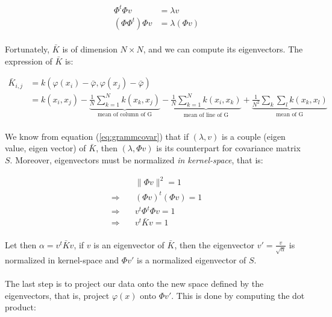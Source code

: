 \documentclass[a4paper]{article}
\begin{document}
\begin{align}\label{eq:grammcovar}
\Phi^t\Phi v &= \lambda v \\
(\Phi\Phi^t)\Phi v &= \lambda (\Phi v)
\end{align}

\paragraph{}
Fortunately, $\bar{K}$ is of dimension $N \times N$, and we can compute its eigenvectors. The expression of $\bar{K}$ is:

\begin{align*}
\bar{K}_{i, j} &= k(\varphi(x_i) - \bar{\varphi}, \varphi(x_j) - \bar{\varphi}) \\
&= k(x_i, x_j)
	- \underbrace{\frac{1}{N}\sum_{k = 1}^N k(x_k, x_j)}_{\text{mean of column of G}}
    - \underbrace{\frac{1}{N}\sum_{k = 1}^N k(x_i, x_k)}_{\text{mean of line of G}}
    + \underbrace{\frac{1}{N^2}\sum_k\sum_l k(x_k, x_l)}_{\text{mean of G}}
\end{align*}

\paragraph{}
We know from equation (\ref{eq:grammcovar}) that if $(\lambda, v)$ is a couple (eigen value, eigen vector) of $\bar{K}$, then $(\lambda, \Phi v)$ is its counterpart for covariance matrix $S$. Moreover, eigenvectors must be normalized \emph{in kernel-space}, that is:

\begin{align*}
&\| \Phi v \|^2 = 1 \\
\Rightarrow\quad &(\Phi v)^t(\Phi v) = 1 \\
\Rightarrow\quad &v^t\Phi^t\Phi v = 1 \\
\Rightarrow\quad &v^t \bar{K} v = 1
\end{align*}

\paragraph{}
Let then $\alpha = v^t \bar{K} v$, if $v$ is an eigenvector of $\bar{K}$, then the eigenvector $v' = \frac{v}{\sqrt{\alpha}}$ is normalized in kernel-space and $\Phi v'$ is a normalized eigenvector of $S$.


\paragraph{}
The last step is to project our data onto the new space defined by the eigenvectors, that is, project $\varphi(x)$ onto $\Phi v'$. This is done by computing the dot product:
\end{document}
